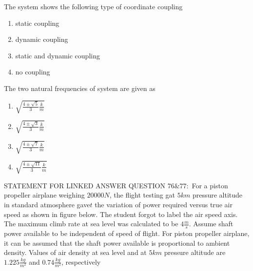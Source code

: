  \item The system shows the following type of coordinate coupling
     \begin{enumerate}
         \item static coupling
         \item dynamic coupling
         \item static and dynamic coupling
         \item no coupling
     \end{enumerate}
     \item The two natural frequencies of system are given as
     \begin{enumerate}
         \item $\sqrt{\frac{4\pm\sqrt{5}}{3}\frac{k}{m}}$
         \item $\sqrt{\frac{4\pm\sqrt{3}}{3}\frac{k}{m}}$
         \item $\sqrt{\frac{4\pm\sqrt{7}}{3}\frac{k}{m}}$
         \item $\sqrt{\frac{4\pm\sqrt{11}}{3}\frac{k}{m}}$
     \end{enumerate}
     STATEMENT FOR LINKED ANSWER QUESTION $76\&77:$ For a piston propeller airplane weighing $20000 N$, the flight testing gat $5 km$ pressure altitude in standard atmosphere gave$ t$ the variation of power required versus true air speed as shown in figure below. The student forgot to label the air speed axis. The maximum climb rate at sea level was calculated to be $4 \frac{m}{s}$. Assume shaft power available to be independent of speed of flight. For piston propeller airplane, it can be assumed that the shaft power available is proportional to ambient density. Values of air density at sea level and at $5 km$ pressure altitude are $1.225 \frac{kg}{m^2}$ and $0.74 \frac{kg}{m^2}$, respectively
